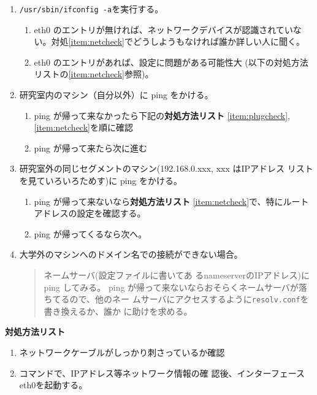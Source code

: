 \documentclass{jreport}
\begin{document}
\begin{enumerate}
\item \verb|/usr/sbin/ifconfig -a|を実行する。
  \begin{enumerate}
  \item eth0 のエントリが無ければ、ネットワークデバイスが認識されていな
    い。対処\ref{item:netcheck}でどうしようもなければ誰か詳しい人に聞く。
  \item eth0 のエントリがあれば、設定に問題がある可能性大
    (以下の対処方法リストの\ref{item:netcheck}参照)。
  \end{enumerate}
\item 研究室内のマシン（自分以外）に ping をかける。
  \begin{enumerate}
  \item ping が帰って来なかったら下記の\textbf{対処方法リスト}
    \ref{item:plugcheck},\ref{item:netcheck}を順に確認
  \item ping が帰って来たら次に進む
  \end{enumerate}
\item 研究室外の同じセグメントのマシン(192.168.0.xxx, xxx はIPアドレス
  リストを見ていろいろためす)に ping をかける。
  \begin{enumerate}
  \item ping が帰って来ないなら\textbf{対処方法リスト}
    \ref{item:netcheck}で、特にルートアドレスの設定を確認する。
  \item ping が帰ってくるなら次へ。
  \end{enumerate}
\item 大学外のマシンへのドメイン名での接続ができない場合。
  \begin{quote}
    ネームサーバ(設定ファイルに書いてあ
    るnameserverのIPアドレス)にping してみる。
    ping が帰って来ないならおそらくネームサーバが落ちてるので、他のネー
    ムサーバにアクセスするように\verb|resolv.conf|を書き換えるか、誰か
    に助けを求める。
  \end{quote}
\end{enumerate}

\noindent
\textbf{対処方法リスト}
\begin{enumerate}
\item \label{item:plugcheck}ネットワークケーブルがしっかり刺さっているか確認
\item \label{item:netcheck}
  コマンドで、IPアドレス等ネットワーク情報の確
  認後、インターフェースeth0を起動する。
\end{enumerate}
\end{document}
